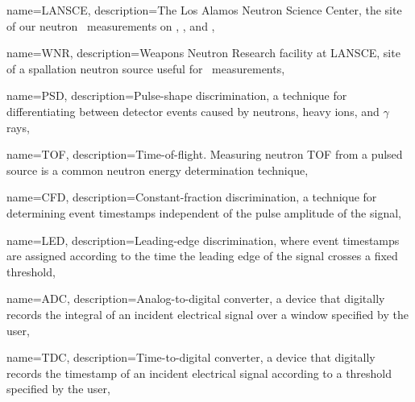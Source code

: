 {
    name={LANSCE},
    description={The Los Alamos Neutron Science Center, the site of our neutron \tot\ measurements on
    \oSixEight, \niEightFour, and \snTwelveFour},
}

{
    name={WNR},
    description={Weapons Neutron Research facility at LANSCE, site of a spallation neutron source
    useful for \tot\ measurements},
}

{
    name={PSD},
    description={Pulse-shape discrimination, a technique for differentiating between detector events
    caused by neutrons, heavy ions, and $\gamma$ rays},
}

{
    name={TOF},
    description={Time-of-flight. Measuring neutron TOF from a pulsed source is a common
    neutron energy determination technique},
}

{
    name={CFD},
    description={Constant-fraction discrimination, a technique for determining event timestamps
    independent of the pulse amplitude of the signal},
}

{
    name={LED},
    description={Leading-edge discrimination, where event timestamps are assigned according to the
    time the leading edge of the signal crosses a fixed threshold},
}

{
    name={ADC},
    description={Analog-to-digital converter, a device that digitally records the integral of an 
    incident electrical signal over a window specified by the user},
}

{
    name={TDC},
    description={Time-to-digital converter, a device that digitally records the timestamp of an
    incident electrical signal according to a threshold specified by the user},
}
